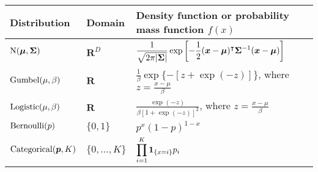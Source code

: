 \begin{tabularx}{\linewidth}{llX}
	Distribution & Domain                                                                                                               & Density function or probability mass function $f(x)$ \\
	\midrule
	$\mathrm{N}( \bm{\mu}, \bm{\Sigma} )$
	             & $\mathbf{R}^D$
	             & $\displaystyle \frac{1}{\sqrt{2 \pi \lvert\bm{\Sigma}\rvert}}
	\exp \left[ -\frac{1}{2} (\bm{x} - \bm{\mu})^\intercal \bm{\Sigma}^{-1} (\bm{x} - \bm{\mu}) \right] $                                                                                             \\
	\rule{0pt}{5ex}%
	$\mathrm{Gumbel}( \mu, \beta )$
	             & $\mathbf{R}$
	             & $\displaystyle \frac{1}{\beta} \exp \{ - [z + \exp(-z)]\}$, where $\displaystyle z = \frac{x - \mu}{\beta}$                                                                 \\
	\rule{0pt}{5ex}%
	$\mathrm{Logistic}( \mu, \beta )$
	             & $\mathbf{R}$
	             & $\displaystyle \frac{\exp(-z)}{\beta \left[1 + \exp(-z) \right]^2}$, where $\displaystyle z = \frac{x - \mu}{\beta}$                                                        \\
	\rule{0pt}{5ex}%
	$\mathrm{Bernoulli}( p )$
	             & $\{0, 1\}$
	             & $\displaystyle p^x (1-p)^{1-x}$                                                                                                                                             \\
	\rule{0pt}{5ex}%
	$\mathrm{Categorical}( \bm{p}, K )$
	             & $\{0, \ldots, K\}$
	             & $\displaystyle \prod_{i=1}^K \bm{1}_{\left \{ x=i \right \} } p_i$                                                                                                                               \\
\end{tabularx}

\endgroup

